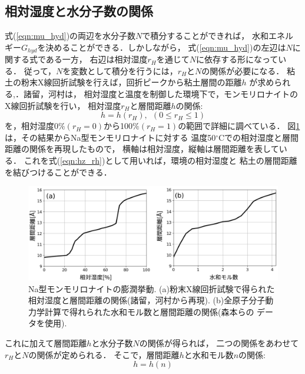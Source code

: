 \subsection{相対湿度と水分子数の関係}
式(\ref{eqn:mu_hyd})の両辺を水分子数\(N\)で積分することができれば，
水和エネルギー\(G_{hyd}\)を決めることができる．しかしながら，
式(\ref{eqn:mu_hyd})の左辺は\(N\)に関する式である一方，
右辺は相対湿度\(r_H\)を通じて\(N\)に依存する形になっている．
従って，$N$を変数として積分を行うには，\(r_H\)と\(N\)の関係が必要になる．
粘土の粉末X線回折試験を行えば，回折ピークから粘土層間の距離\(h\)
が求められる\cite{Morodome},\cite{Yamada}．諸留，河村\cite{Morodome}は，
相対湿度と温度を制御した環境下で，モンモリロナイトのX線回折試験を行い，
相対湿度$r_H$と層間距離$h$の関係:
\begin{equation}
	h=h(r_H), \ \ (0 \leq r_H \leq 1)
	\label{eqn:hz_rh}
\end{equation}
を，相対湿度0$\% (r_H=0)$から100$\% (r_H=1)$の範囲で詳細に調べている．
図\ref{fig:fig1}は，その結果からNa型モンモリロナイトに対する
温度50\(^\circ\)Cでの相対湿度と層間距離の関係を再現したもので，
横軸は相対湿度，縦軸は層間距離を表している．
これを式(\ref{eqn:hz_rh})として用いれば，環境の相対湿度と
粘土の層間距離を結びつけることができる．
\begin{figure}[h]
	\begin{center}
	\includegraphics[width=1.0\linewidth]{Figs/fig1.pdf} 
	\end{center}
	\caption{
		Na型モンモリロナイトの膨潤挙動.
		(a)粉末X線回折試験で得られた相対湿度と層間距離の関係(諸留，河村\cite{Morodome}から再現).
		(b)全原子分子動力学計算で得れられた水和モル数と層間距離の関係(森本ら\cite{Morimoto}の
		データを使用). 
	} 
	\label{fig:fig1}
\end{figure}
これに加えて層間距離\(h\)と水分子数\(N\)の関係が得られば，
二つの関係をあわせて\(r_H\)と\(N\)の関係が定められる．
そこで，層間距離$h$と水和モル数\(n\)の関係:
\begin{equation}
	h=h(n)
	\label{eqn:hz_nw}
\end{equation}
